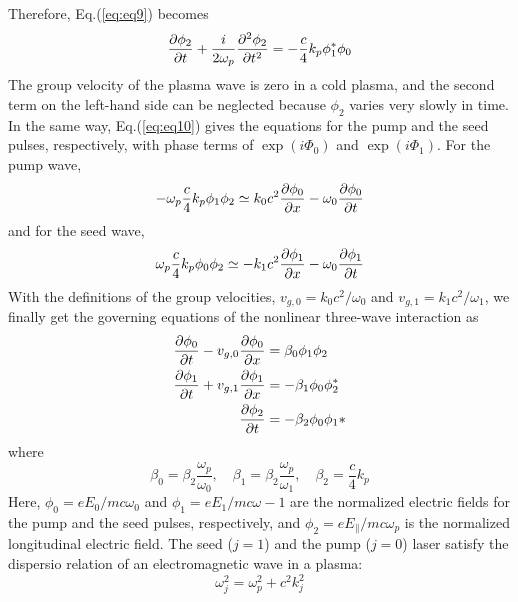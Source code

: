 \documentclass{article}
\begin{document}
    Therefore, Eq.(\ref{eq:eq9}) becomes
    \begin{equation}
        \pdv{\phi_2}{t} + \frac{i}{2\omega_p}\pdv[2]{\phi_2}{t} = -\frac{c}{4}k_p\phi_1^*\phi_0
    \end{equation}
    The group velocity of the plasma wave is zero in a cold plasma, and the second term on the left-hand side can be neglected because $\phi_2$ varies very slowly in time.
    In the same way, Eq.(\ref{eq:eq10}) gives the equations for the pump and the seed pulses, respectively, with phase terms of $\exp(i\Phi_0)$ and $\exp(i\Phi_1)$. For the pump wave,
    \begin{equation}
        -\omega_p\frac{c}{4}k_p\phi_1\phi_2 \simeq k_0c^2\pdv{\phi_0}{x} - \omega_0\pdv{\phi_0}{t}
    \end{equation}
    and for the seed wave,
    \begin{equation}
        \omega_p\frac{c}{4}k_p\phi_0\phi_2 \simeq -k_1c^2\pdv{\phi_1}{x} - \omega_0\pdv{\phi_1}{t}
    \end{equation}
    With the definitions of the group velocities, $v_{g,0}=k_0c^2/\omega_0$ and $v_{g,1}=k_1c^2/\omega_1$, we finally get the governing equations of the nonlinear three-wave interaction as \cite{lee_solitary_2003}
    \begin{equation} \label{eq:three_wave_interaction}
        \begin{aligned}
            \pdv{\phi_0}{t} - v_{g,0}\pdv{\phi_0}{x} &= \beta_0\phi_1\phi_2 \\
            \pdv{\phi_1}{t} + v_{g,1}\pdv{\phi_1}{x} &= -\beta_1\phi_0\phi_2^* \\
            \pdv{\phi_2}{t} &= -\beta_2\phi_0\phi_1* 
        \end{aligned}
    \end{equation}
    where 
    \begin{equation}
        \beta_0=\beta_2\frac{\omega_p}{\omega_0}, \quad
        \beta_1=\beta_2\frac{\omega_p}{\omega_1}, \quad
        \beta_2=\frac{c}{4}k_p
    \end{equation}
    Here, $\phi_0 = eE_0/mc\omega_0$ and $\phi_1=eE_1/mc\omega-1$ are the normalized electric fields for the pump and the seed pulses, respectively, and $\phi_2=eE_{\parallel}/mc\omega_p$ is the normalized longitudinal electric field. The seed ($j=1$) and the pump ($j=0$) laser satisfy the dispersio relation of an electromagnetic wave in a plasma:
    \begin{equation}
        \omega_j^2 = \omega_p^2 + c^2k_j^2
    \end{equation}
\end{document}
